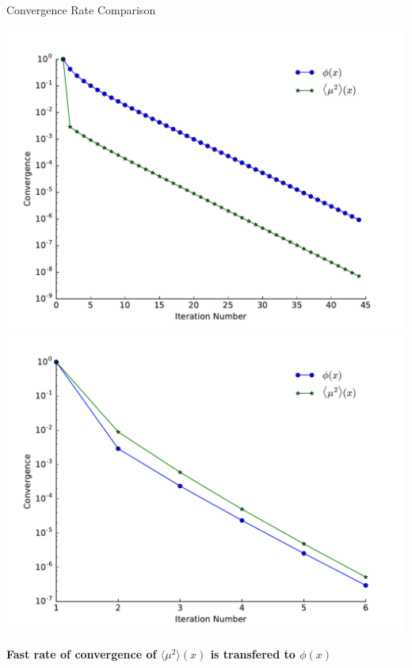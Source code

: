 \documentclass[10pt]{beamer}
\newcommand{\edd}{\langle \mu^2 \rangle}
\begin{document}
\begin{frame}{Convergence Rate Comparison}

    \onslide<+->
    \begin{center}

        \includegraphics[width=.45\paperwidth]{figs/converge_una.pdf}
        \includegraphics[width=.45\paperwidth]{figs/converge_acc.pdf}

    \end{center}

    \onslide<+->
    \vfill
    \centerline{\textbf{Fast rate of convergence of $\edd(x)$ is transfered to $\phi(x)$}}

\end{frame}
\end{document}
